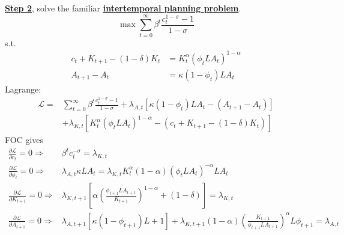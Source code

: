 \documentclass[10pt,landscape,a4paper]{article}
\begin{document}
\begin{multicols*}{3}

\vspace{2pt}
\underline{\textbf{Step 2}}, solve the familiar \textbf{\color{myred}\underline{intertemporal planning problem}}.
$$\max\sum^{\infty}_{t=0}\beta^t \frac{c_t^{1-\sigma}-1}{1-\sigma}
$$
s.t.
\begin{align*}
    c_t+K_{t+1}-(1-\delta)K_t &= K_t^{\alpha}\left(\phi_t L A_t\right)^{1-\alpha}\\
    A_{t+1}-A_t &= \kappa(1-\phi_t)LA_t
\end{align*}
Lagrange:
\begin{align*}
    \mathcal{L}=&\sum^{\infty}_{t=0}\beta^t\frac{c_t^{1-\sigma}-1}{1-\sigma} +\lambda_{A,t}\left[\kappa(1-\phi_t)LA_t-\left(A_{t+1}-A_t\right)\right]\\
    &+ \lambda_{K,t}\left[K_t^{\alpha}\left(\phi_t L A_t\right)^{1-\alpha}-\left(c_t+K_{t+1}-(1-\delta)K_t\right)\right]
\end{align*}
FOC gives
\begin{align*}
    \frac{\partial \mathcal{L}}{\partial c_t}=0 \Rightarrow & \beta^t c_t^{-\sigma}=\lambda_{K,t}\\
    \frac{\partial \mathcal{L}}{\partial \phi_t} =0\Rightarrow & \lambda_{A,t}\kappa LA_t = \lambda_{K,t}K_t^{\alpha}(1-\alpha)\left(\phi_tLA_t\right)^{-\alpha}LA_t \\
    \frac{\partial \mathcal{L}}{\partial K_{t+1}}=0\Rightarrow & \lambda_{K,t+1}\left[\alpha\left(\frac{\phi_{t+1}LA_{t+1}}{K_{t+1}}\right)^{1-\alpha}+(1-\delta)\right]=\lambda_{K,t}\\
    \frac{\partial \mathcal{L}}{\partial A_{t+1}}=0\Rightarrow & \lambda_{A,t+1}\left[\kappa(1-\phi_{t+1})L+1 \right] +\lambda_{K,t+1}(1-\alpha)\left(\frac{K_{t+1}}{\phi_{t+1}L A_{t+1}}\right)^{\alpha}L\phi_{t+1}=\lambda_{A,t}
\end{align*}

\vspace{2pt}
\end{multicols*}
\end{document}
